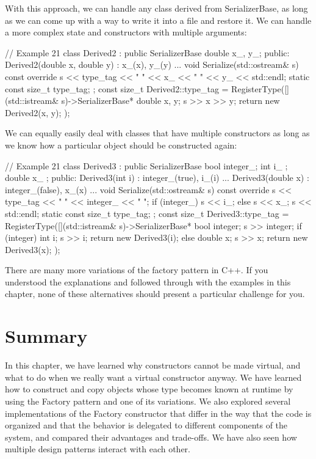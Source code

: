 With this approach, we can handle any class derived from SerializerBase, as long as we can come up with a way to write it into a file and restore it. We can handle a more complex state and constructors with multiple arguments:

\begin{code}
// Example 21
class Derived2 : public SerializerBase {
  double x_, y_;
  public:
  Derived2(double x, double y) : x_(x), y_(y) {...}
  void Serialize(std::ostream& s) const override {
    s << type_tag << " " << x_ << " " << y_ << std::endl;
  }
  static const size_t type_tag;
};
const size_t Derived2::type_tag =
  RegisterType([](std::istream& s)->SerializerBase* {
    double x, y; s >> x >> y;
    return new Derived2(x, y);
});
\end{code}

We can equally easily deal with classes that have multiple constructors as long as we know how a particular object should be constructed again:

\begin{code}
// Example 21
class Derived3 : public SerializerBase {
  bool integer_;
  int i_ {};
  double x_ {};
  public:
  Derived3(int i) : integer_(true), i_(i) {...}
  Derived3(double x) : integer_(false), x_(x) {...}
  void Serialize(std::ostream& s) const override {
    s << type_tag << " " << integer_ << " ";
    if (integer_) s << i_; else s << x_;
    s << std::endl;
  }
  static const size_t type_tag;
};
const size_t Derived3::type_tag =
  RegisterType([](std::istream& s)->SerializerBase* {
    bool integer; s >> integer;
    if (integer) {
      int i; s >> i; return new Derived3(i);
    } else {
      double x; s >> x; return new Derived3(x);
  }
});
\end{code}

There are many more variations of the factory pattern in C++. If you understood the explanations and followed through with the examples in this chapter, none of these alternatives should present a particular challenge for you.

\section{Summary}

In this chapter, we have learned why constructors cannot be made virtual, and what to do when we really want a virtual constructor anyway. We have learned how to construct and copy objects whose type becomes known at runtime by using the Factory pattern and one of its variations. We also explored several implementations of the Factory constructor that differ in the way that the code is organized and that the behavior is delegated to different components of the system, and compared their advantages and trade-offs. We have also seen how multiple design patterns interact with each other.

